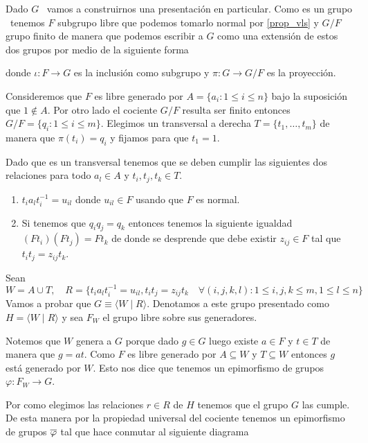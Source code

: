 \documentclass[tesis.tex]{subfiles}
\begin{document}
\begin{obs}\label{obs_presentacion_vl}
	Dado $G$ \vl \ vamos a construirnos una presentación en particular.
	Como es un grupo \vl \ tenemos $F$ subgrupo libre que podemos tomarlo normal por \ref{prop_vls} y $G/F$ grupo finito de manera que podemos escribir a $G$ como una extensión de estos dos grupos por medio de la siguiente forma
	\begin{center}
	\end{center}
	donde $\iota: F \to G$ es la inclusión como subgrupo y $\pi: G \to G/F$ es la proyección.

	
	Consideremos que $F$ es libre generado por $A = \{ a_i : 1 \le i \le n \}$ bajo la suposición que $1 \notin A$.
	Por otro lado el cociente $G/F$ resulta ser finito entonces $G/F = \{ q_i : 1 \le i \le m \}$.
	Elegimos un transversal a derecha $T = \{ t_1, \dots, t_m \}$ de manera que $\pi(t_i)= q_i$ y fijamos para que $t_1 = 1$.
	
	Dado que es un transversal tenemos que se deben cumplir las siguientes dos relaciones para todo $a_l \in A$ y $t_i,t_j,t_k \in T$. 
	\begin{enumerate}
		\item $t_ia_{l}t_i^{-1} = u_{il}$ donde $u_{il} \in F$ usando que $F$ es normal.
		\item Si tenemos que $q_iq_j = q_k$ entonces tenemos la siguiente igualdad 
		$(Ft_{i}) (Ft_{j}) = Ft_{k}$
		de donde se desprende que debe existir $z_{ij} \in F$ tal que 
		 $t_it_j = z_{ij}t_k$.
	\end{enumerate}
	Sean
	\[
		W = A \cup T, \quad R = \{t_ia_{l}t_i^{-1} = u_{il},  t_it_j = z_{ij}t_k \quad \forall (i,j,k,l) :   1 \le i,j,k \le m, 1 \le l  \le n \}
	\]
	Vamos a probar que $G \equiv \langle W \mid R \rangle$. 
	Denotamos a este grupo presentado como $H = \langle W \mid R \rangle$ y sea $F_{W}$ el grupo libre sobre sus generadores.
	
	Notemos que $W$ genera a $G$ porque
	dado $g \in G$ luego existe $a \in F$ y $t \in T$ de manera que $g = at$.
	Como $F$ es libre generado por $A \subseteq W$ y $T \subseteq W$ entonces $g$ está generado por $W$. 
	Esto nos dice que tenemos un epimorfismo de grupos $\varphi: F_{W} \to G$.
	
	Por como elegimos las relaciones $r \in R$ de $H$ tenemos que el grupo $G$ las cumple.
	De esta manera por la propiedad universal del cociente tenemos un epimorfismo de grupos $\overline \varphi$ tal que hace conmutar al siguiente diagrama	
	\begin{center}
	\end{center}
	

\end{obs}
\end{document}
